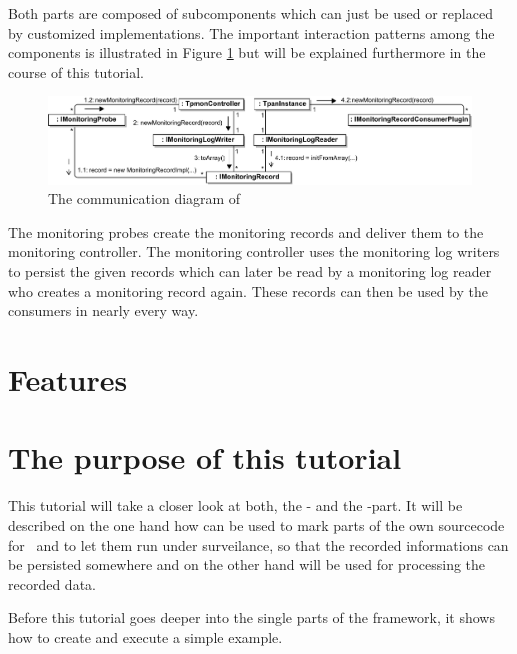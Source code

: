 \noindent Both parts are composed of subcomponents which can just be used or %
replaced by customized implementations. The important interaction patterns among %
the components is illustrated in Figure \ref{Figure:KiekerCommunicationDiagram} %
but will be explained furthermore in the course of this tutorial. %

\begin{figure}[H]\centering
\includegraphics[width=1\textwidth]{images/kiekerCommunications-revisedReArranged-woMonitoringLog-bw}
\caption{The communication diagram of \Kieker}
\label{Figure:KiekerCommunicationDiagram}
\end{figure}
		
\noindent\notify The monitoring probes create the monitoring records and deliver them to the monitoring controller. The monitoring controller uses the monitoring log writers to persist the given records which can later be read by a monitoring log reader who creates a monitoring record again. These records can then be used by the consumers in nearly every way.

\section{Features}
	
\section{The purpose of this tutorial}
This tutorial will take a closer look at both, the \KiekerMonitoringPart - and the \KiekerAnalysisPart-part. It will be described on the one hand how \KiekerMonitoringPart  can be used to mark parts of the own sourcecode for \Kieker\  and to let them run under surveilance, so that the recorded informations can be persisted somewhere and on the other hand \KiekerAnalysisPart will be used for processing the recorded data.

Before this tutorial goes deeper into the single parts of the framework, it shows how to create and execute a simple example.